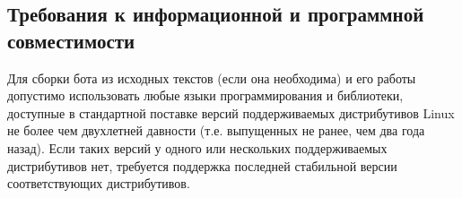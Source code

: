 \subsection{Требования к информационной и программной совместимости}
\label{sec:req:compat}
Для сборки бота из исходных текстов (если она необходима) и его работы допустимо использовать
любые языки программирования и библиотеки, доступные в стандартной поставке версий поддерживаемых
дистрибутивов Linux не более чем двухлетней давности (т.е. выпущенных не ранее, чем два
года назад). Если таких версий у одного или нескольких поддерживаемых дистрибутивов нет,
требуется поддержка последней стабильной версии соответствующих дистрибутивов.
